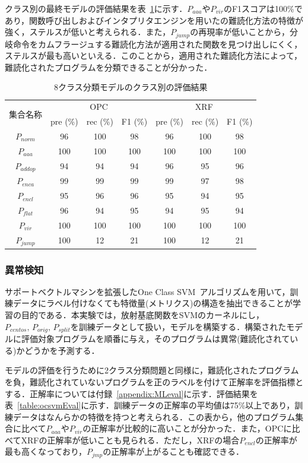 \documentclass[12pt]{jarticle}
\newcommand\doubleRule{\toprule\toprule}
\begin{document}
クラス別の最終モデルの評価結果を表~\ref{table:classRes}に示す．$P_{aaa}$や$P_{vir}$のF1スコアは100\%であり，関数呼び出しおよびインタプリタエンジンを用いたの難読化方法の特徴が強く，ステルスが低いと考えられる．また，$P_{jump}$の再現率が低いことから，分岐命令をカムフラージュする難読化方法が適用された関数を見つけ出しにくく，ステルスが最も高いといえる．このことから，適用された難読化方法によって，難読化されたプログラムを分類できることが分かった．
\begin{table}[t!]
\centering
\caption{8クラス分類モデルのクラス別の評価結果}
\label{table:classRes}
\begin{tabular}[t]{c|ccc|ccc}
\doubleRule
\multirow{2}{*}{集合名称} & \multicolumn{3}{c|}{OPC} & \multicolumn{3}{c}{XRF} \\\cline{2-7}
& pre (\%) & rec (\%) & F1 (\%) & pre (\%) & rec (\%) & F1 (\%) \\
\hline
$P_{norm}$ & 96 & 100 & 98 & 96 & 100 & 98 \\
$P_{aaa}$ & 100 & 100 & 100 & 100 & 100 & 100 \\
$P_{addop}$ & 94 & 94  & 94 & 96 & 95 & 96 \\
$P_{enca}$ & 99 & 99 & 99 & 99 & 97 & 98 \\
$P_{encl}$ & 95 & 96 & 96 & 95 & 94 & 95 \\
$P_{flat}$ & 96 & 94 & 95 & 94 & 95 & 94 \\
$P_{vir}$ & 100 & 100 & 100 & 100 & 100 & 100 \\
$P_{jump}$ & 100 & 12 & 21 & 100 & 12 & 21 \\
\bottomrule
\end{tabular}
\end{table}

\newpage

\subsubsection{異常検知}
サポートベクトルマシンを拡張したOne Class SVM~\cite{OCSVM}アルゴリズムを用いて，訓練データにラベル付けなくても特徴量(メトリクス)の構造を抽出できることが学習の目的である．本実験では，放射基底関数をSVMのカーネルにし，$P_{centos},\,P_{orig},\,P_{split}$を訓練データとして扱い，モデルを構築する．構築されたモデルに評価対象プログラムを順番に与え，そのプログラムは異常(難読化されている)かどうかを予測する．

モデルの評価を行うために2クラス分類問題と同様に，難読化されたプログラムを負，難読化されていないプログラムを正のラベルを付けて正解率を評価指標とする．正解率については付録~\ref{appendix:MLeval}に示す．評価結果を表~\ref{table:ocsvmEval}に示す．訓練データの正解率の平均値は75\%以上であり，訓練データはなんらかの特徴を持つと考えられる．この表から，他のプログラム集合に比べて$P_{aaa}$や$P_{vir}$の正解率が比較的に高いことが分かった．また，OPCに比べてXRFの正解率が低いことも見られる．ただし，XRFの場合$P_{encl}$の正解率が最も高くなっており，$P_{jmp}$の正解率が上がることも確認できる．
\end{document}
